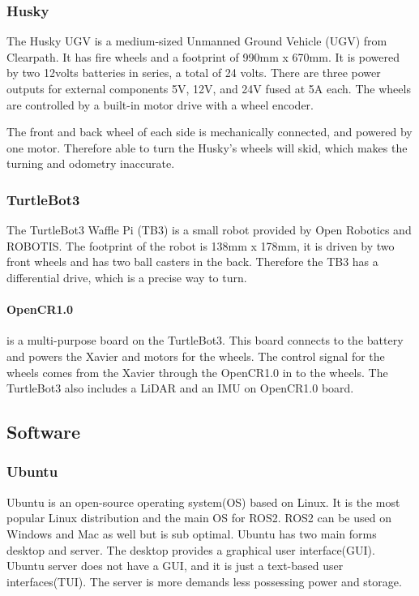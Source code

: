 \subsubsection{Husky}
The Husky UGV is a medium-sized Unmanned Ground Vehicle (UGV) from Clearpath. It has fire wheels and a footprint of 990mm x 670mm. It is powered by two 12volts batteries in series, a total of 24 volts. There are three power outputs for external components 5V, 12V, and 24V fused at 5A each. The wheels are controlled by a built-in motor drive with a wheel encoder.

The front and back wheel of each side is mechanically connected, and powered by one motor. Therefore able to turn the Husky's wheels will skid, which makes the turning and odometry inaccurate. 

\subsubsection{TurtleBot3}
The TurtleBot3 Waffle Pi (TB3) is a small robot provided by Open Robotics and ROBOTIS. The footprint of the robot is 138mm x 178mm, it is driven by two front wheels and has two ball casters in the back. Therefore the TB3 has a differential drive, which is a precise way to turn. 

\paragraph{OpenCR1.0} is a multi-purpose board on the TurtleBot3. This board connects to the battery and powers the Xavier and motors for the wheels. The control signal for the wheels comes from the Xavier through the OpenCR1.0 in to the wheels. 
The TurtleBot3 also includes a LiDAR and an IMU on OpenCR1.0 board.

\subsection{Software}

\subsubsection{Ubuntu}

Ubuntu is an open-source operating system(OS) based on Linux\cite{ubuntu}\cite{osi}. It is the most popular Linux distribution and the main OS for ROS2. ROS2 can be used on Windows and Mac as well but is sub optimal. Ubuntu has two main forms desktop and server. The desktop provides a graphical user interface(GUI). Ubuntu server does not have a GUI, and it is just a text-based user interfaces(TUI). The server is more demands less possessing power and storage. 


